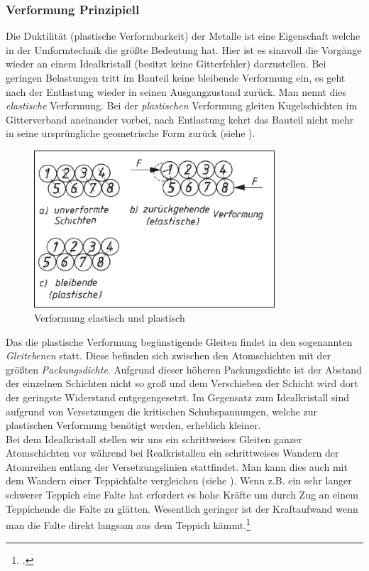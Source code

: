 \documentclass[12pt,a4paper,parskip]{scrartcl}
\begin{document}
{\subsubsection{Verformung Prinzipiell}
Die Duktilität (plastische Verformbarkeit) der Metalle ist eine Eigenschaft welche in der Umformtechnik die größte Bedeutung hat. Hier ist es sinnvoll die Vorgänge wieder an einem Idealkristall (besitzt keine Gitterfehler) darzustellen. Bei geringen Belastungen tritt im Bauteil keine bleibende Verformung ein, es geht nach  der Entlastung wieder in seinen Ausgangzustand zurück. Man nennt dies \emph{elastische} Verformung. Bei der \emph{plastischen} Verformung gleiten Kugelschichten im Gitterverband aneinander vorbei,  nach Entlastung kehrt das Bauteil nicht mehr in seine ursprüngliche geometrische Form zurück (siehe ).
\begin{figure}
\centering
\includegraphics[width=0.8\textwidth]{eloplastkristall}
\caption[Verformung elastisch und plastisch]{Verformung elastisch und plastisch\protect\footnotemark}
\label{fig:eloplastkristall} 
\end{figure}
Das die plastische Verformung begünstigende Gleiten findet in den sogenannten \emph{Gleitebenen} statt. Diese befinden sich zwischen den Atomschichten mit der größten \emph{Packungsdichte}. Aufgrund dieser höheren Packungsdichte ist der Abstand der einzelnen Schichten nicht so groß und dem Verschieben der Schicht wird dort der  geringste Widerstand entgegengesetzt. Im Gegensatz zum Idealkristall sind aufgrund von Versetzungen die kritischen Schubspannungen, welche zur plastischen Verformung benötigt werden,  erheblich kleiner.\\ Bei dem Idealkristall stellen wir uns ein schrittweises Gleiten ganzer Atomschichten vor während bei Realkristallen ein schrittweises Wandern der Atomreihen entlang der Versetzungslinien stattfindet. Man kann dies auch mit dem Wandern einer Teppichfalte vergleichen (siehe ). Wenn z.B. ein sehr langer schwerer Teppich eine Falte hat erfordert es hohe Kräfte um durch Zug an einem Teppichende die Falte zu glätten. Wesentlich geringer ist der Kraftaufwand wenn man die Falte direkt langsam aus dem Teppich kämmt.\footcite[Vgl.][45-53]{wk}
}
\end{document}
